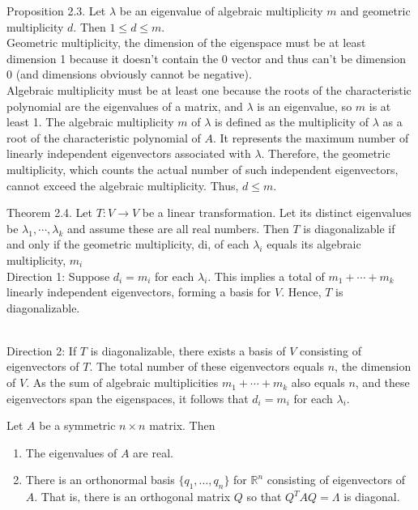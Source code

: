 \documentclass[12pt]{article}
\begin{document}
Proposition 2.3. Let $\lambda$ be an eigenvalue of algebraic multiplicity $m$ and geometric multiplicity $d$. Then  $1 \leq d \leq m$.\\
Geometric multiplicity, the dimension of the eigenspace must be at least dimension 1 because it doesn't contain the 0 vector and thus can't be dimension 0 (and dimensions obviously cannot be negative).\\
Algebraic multiplicity must be at least one because the roots of the characteristic polynomial are the eigenvalues of a matrix, and $\lambda$ is an eigenvalue, so $m$ is at least 1. 
The algebraic multiplicity \( m \) of \( \lambda \) is defined as the multiplicity of \( \lambda \) as a root of the characteristic polynomial of \( A \). It represents the maximum number of linearly independent eigenvectors associated with \( \lambda \). Therefore, the geometric multiplicity, which counts the actual number of such independent eigenvectors, cannot exceed the algebraic multiplicity. Thus, \( d \leq m \).


Theorem 2.4. Let $T : V \to V$ be a linear transformation. Let its distinct eigenvalues be
$\lambda_1, \cdots, \lambda_k$ and assume these are all real numbers. Then $T$ is diagonalizable if and only if
the geometric multiplicity, di, of each $\lambda_i$ equals its algebraic multiplicity, $m_i$
\\
Direction 1: Suppose \( d_i = m_i \) for each \( \lambda_i \). This implies a total of \( m_1 + \cdots + m_k \) linearly independent eigenvectors, forming a basis for \( V \). Hence, \( T \) is diagonalizable.

\\
Direction 2: If \( T \) is diagonalizable, there exists a basis of \( V \) consisting of eigenvectors of \( T \). The total number of these eigenvectors equals \( n \), the dimension of \( V \). As the sum of algebraic multiplicities \( m_1 + \cdots + m_k \) also equals \( n \), and these eigenvectors span the eigenspaces, it follows that \( d_i = m_i \) for each \( \lambda_i \).

\begin{theorem}
Let \( A \) be a symmetric \( n \times n \) matrix. Then
\begin{enumerate}
    \item The eigenvalues of \( A \) are real.
    \item There is an orthonormal basis \( \{q_1, \ldots, q_n\} \) for \( \mathbb{R}^n \) consisting of eigenvectors of \( A \). That is, there is an orthogonal matrix \( Q \) so that \( Q^T A Q = \Lambda \) is diagonal.
\end{enumerate}
\end{theorem}
\end{document}
